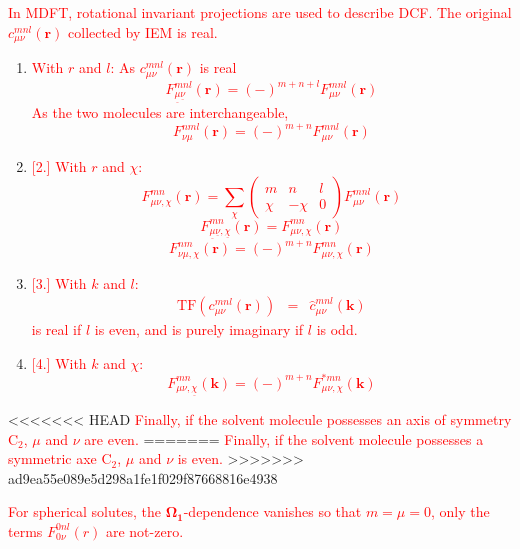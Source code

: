 \textcolor{red}{In MDFT, rotational invariant projections are used
to describe DCF. The original $c_{\mu\nu}^{mnl}(\mathbf{r})$ collected
by IEM is real.}
\begin{enumerate}
\item \textcolor{red}{With $r$ and $l$: As $c_{\mu\nu}^{mnl}(\mathbf{r})$
is real
\begin{equation}
F_{\underline{\mu}\underline{\nu}}^{mnl}(\mathbf{r})=\left(-\right)^{m+n+l}F_{\mu\nu}^{mnl}(\mathbf{r})
\end{equation}
As the two molecules are interchangeable, 
\begin{equation}
F_{\nu\mu}^{nml}(\mathbf{r})=\left(-\right)^{m+n}F_{\mu\nu}^{mnl}(\mathbf{r})
\end{equation}
}
\item \textcolor{red}{%
[2.]%
With $r$ and $\chi$:
\begin{equation}
F_{\mu\nu,\chi}^{mn}(\mathbf{r})=\sum_{\chi}\left(\begin{array}{ccc}
m & n & l\\
\chi & -\chi & 0
\end{array}\right)F_{\mu\nu}^{mnl}(\mathbf{r})
\end{equation}
\begin{equation}
F_{\underline{\mu}\underline{\nu},\underline{\chi}}^{mn}(\mathbf{r})=F_{\mu\nu,\chi}^{mn}(\mathbf{r})
\end{equation}
\begin{equation}
F_{\nu\mu,\chi}^{nm}(\mathbf{r})=\left(-\right)^{m+n}F_{\mu\nu,\chi}^{mn}(\mathbf{r})
\end{equation}
}
\item \textcolor{red}{%
[3.]%
With $k$ and $l$:
\begin{eqnarray}
\mathrm{TF}(c_{\mu\nu}^{mnl}(\mathbf{r})) & = & \hat{c}_{\mu\nu}^{mnl}(\mathbf{k})
\end{eqnarray}
 is real if $l$ is even, and is purely imaginary if $l$ is odd.}
\item \textcolor{red}{%
[4.]%
With $k$ and $\chi$:
\begin{equation}
F_{\mu\nu,\underline{\chi}}^{mn}(\mathbf{k})=\left(-\right)^{m+n}F_{\mu\nu,\chi}^{*mn}(\mathbf{k})
\end{equation}
}
\end{enumerate}
<<<<<<< HEAD
\textcolor{red}{Finally, if the solvent molecule possesses an axis of symmetry
$\mathrm{C}_{2}$, $\mu$ and $\nu$ are even.}
=======
\textcolor{red}{Finally, if the solvent molecule possesses a symmetric
axe $\mathrm{C}_{2}$, $\mu$ and $\nu$ is even.} %
>>>>>>> ad9ea55e089e5d298a1fe1f029f87668816e4938

\textcolor{red}{For spherical solutes, the $\mathbf{\Omega_{1}}$-dependence
vanishes so that $m=\mu=0$, only the terms $F_{0\nu}^{0nl}(r)$ are
not-zero.}

